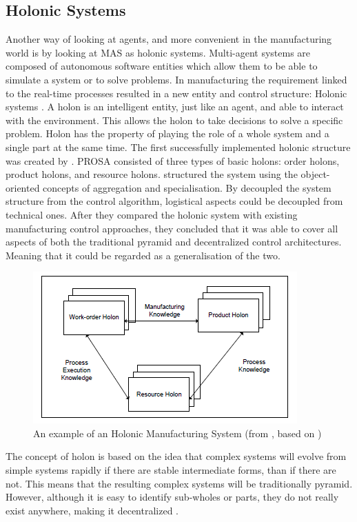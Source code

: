\subsection{Holonic Systems}
Another way of looking at agents, and more convenient in the manufacturing world is by looking at MAS as holonic systems. Multi-agent systems are composed of autonomous software entities which allow them to be able to simulate a system or to solve problems. In manufacturing the requirement linked to the real-time processes resulted in a new entity and control structure: Holonic systems \citep{giret2005multi}. A holon is an intelligent entity, just like an agent, and able to interact with the environment. This allows the holon to take decisions to solve a specific problem. Holon has the property of playing the role of a whole system and a single part at the same time. The first successfully implemented holonic structure was created by \citet{van1998reference}. PROSA consisted of three types of basic holons: order holons, product holons, and resource holons. \citet{van1998reference} structured the system using the object-oriented concepts of aggregation and specialisation. By decoupled the system structure from the control algorithm, logistical aspects could be decoupled from technical ones. After they compared the holonic system with existing manufacturing control approaches, they concluded that it was able to cover all aspects of both the traditional pyramid and decentralized control architectures. Meaning that it could be regarded as a generalisation of the two. 
\begin{figure}[h]
\centering
\includegraphics[width=0.7\linewidth]{img/holonic_manufacturing}
\caption{An example of an Holonic Manufacturing System (from \citet{giret2005multi}, based on \citet{van1998reference})}
\label{fig:holonicmanufacturing}
\end{figure}

The concept of holon is based on the idea that complex systems will evolve from simple systems rapidly if there are stable intermediate forms, than if there are not. This means that the resulting complex systems will be traditionally pyramid. However, although it is easy to identify sub-wholes or parts, they do not really exist anywhere, making it decentralized \citep{van1998reference}.

